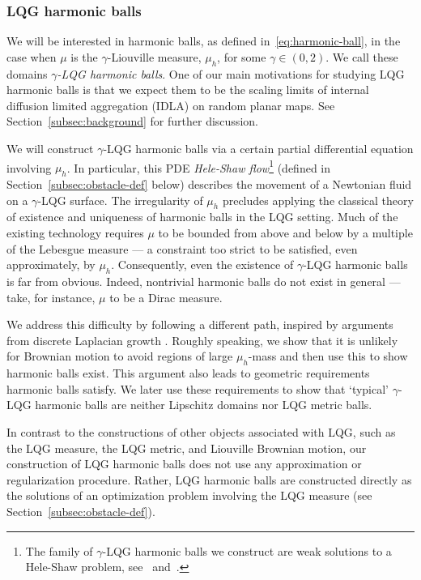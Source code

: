 \documentclass[12pt]{amsart}
\numberwithin{equation}{section}
\begin{document}
	\subsubsection{LQG harmonic balls}
	We will be interested in harmonic balls, as defined in~\eqref{eq:harmonic-ball}, in the case when $\mu$ is the $\gamma$-Liouville measure, $\mu_h$, for some $\gamma\in (0,2)$. 
	We call these domains {\it $\gamma$-LQG harmonic balls}. 
	One of our main motivations for studying LQG harmonic balls is that we expect them to be the scaling limits of internal diffusion limited aggregation (IDLA)  \cite{lawler1992internal} on random planar maps. 
	See Section~\ref{subsec:background} for further discussion. 
	
	We will construct $\gamma$-LQG harmonic balls via a certain partial differential equation involving $\mu_h$. In particular, this PDE {\it Hele-Shaw flow}\footnote{The family of $\gamma$-LQG harmonic balls we construct are weak solutions to a Hele-Shaw problem, see~\cite[Section 3.5]{gustafsson2006conformal} and~\cite{roos2016partial}.} (defined in Section~\ref{subsec:obstacle-def} below)
	describes the movement of a Newtonian fluid on a $\gamma$-LQG surface.
	The irregularity of $\mu_h$ precludes applying the classical theory of existence and uniqueness of harmonic balls \cite{sakai1984solutions, friedman1988free, gustafsson1990onquadraturedomains, caffarelli1998obstacle} in the LQG setting. 
	Much of the existing technology requires $\mu$ to be bounded from above and below by a multiple of the Lebesgue measure --- a constraint 
	too strict to be satisfied, even approximately, by $\mu_h$. Consequently, even the existence of $\gamma$-LQG harmonic balls is far from obvious.
	Indeed, nontrivial harmonic balls do not exist in general --- take, for instance,  $\mu$ to be a Dirac measure. 
	
	We address this difficulty by following a different path, inspired by arguments from discrete Laplacian growth \cite{duminil2013containing, jerison2013internal}. Roughly speaking, we show that it is unlikely for Brownian motion to avoid regions of large $\mu_h$-mass
	and then use this to show harmonic balls exist. This argument also leads to
	geometric requirements harmonic balls satisfy. We later use these requirements to show that `typical' $\gamma$-LQG harmonic balls are neither Lipschitz domains nor LQG metric balls. 
	
	
	In contrast to the constructions of other objects associated with LQG, such as the LQG measure, the LQG metric, and Liouville Brownian motion, our construction of LQG harmonic balls does not use any approximation or regularization procedure. Rather, LQG harmonic balls are constructed directly as the solutions of an optimization problem involving the LQG measure (see Section~\ref{subsec:obstacle-def}).
	
\end{document}
